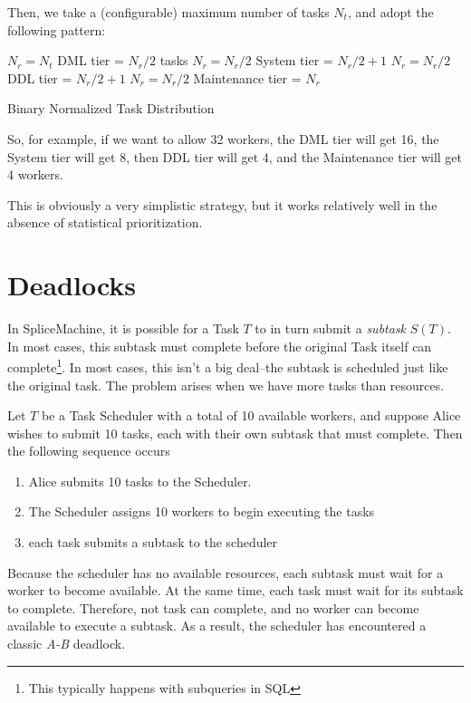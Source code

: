 Then, we take a (configurable) maximum number of tasks $N_t$, and adopt the following pattern:

\begin{algorithm}
\begin{algorithmic}
	\State $N_r = N_t$\;
	\State DML tier = $N_r/2$ tasks\;
	\State $N_r = N_r/2$
	\State System tier = $N_r/2+1$
	\State $N_r = N_r/2$
	\State DDL tier = $N_r/2 +1$
	\State $N_r = N_r/2$
	\State Maintenance tier = $N_r$
\end{algorithmic}
\caption{Binary Normalized Task Distribution}
\end{algorithm}

So, for example, if we want to allow 32 workers, the DML tier will get 16, the System tier will get 8, then DDL tier will get 4, and the Maintenance tier will get 4 workers.

This is obviously a very simplistic strategy, but it works relatively well in the absence of statistical prioritization. 

\section{Deadlocks}
In SpliceMachine, it is possible for a Task $T$ to in turn submit a \emph{subtask} $S(T)$. In most cases, this subtask must complete before the original Task itself can complete\footnote{This typically happens with subqueries in SQL}. In most cases, this isn't a big deal--the subtask is scheduled just like the original task. The problem arises when we have more tasks than resources.

\begin{exmp}
Let $T$ be a Task Scheduler with a total of 10 available workers, and suppose Alice wishes to submit 10 tasks, each with their own subtask that must complete. Then the following sequence occurs

\begin{enumerate}
\item Alice submits 10 tasks to the Scheduler.
\item The Scheduler assigns 10 workers to begin executing the tasks
\item each task submits a subtask to the scheduler
\end{enumerate}
Because the scheduler has no available resources, each subtask must wait for a worker to become available. At the same time, each task must wait for its subtask to complete. Therefore, not task can complete, and no worker can become available to execute a subtask. As a result, the scheduler has encountered a classic \emph{A-B} deadlock.
\end{exmp}

